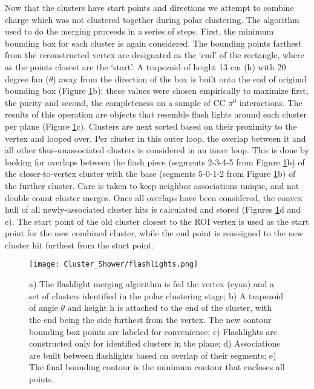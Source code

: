 \par Now that the clusters have start points and directions we attempt to combine charge which was not clustered together during polar clustering. The algorithm used to do the merging proceeds in a series of steps.  First, the minimum bounding box for each cluster is again considered. The bounding points farthest from the reconstructed vertex are designated as the `end' of the rectangle, where as the points closest are the `start'.  A trapezoid of height 13 cm (h) with 20 degree fan ($\theta$) away from the direction of the box is built onto the end of original bounding box (Figure \ref{fig:misc_flashlights}b); these values were chosen empirically to maximize first, the purity and second, the completeness on a sample of CC $\pi^0$ interactions.  The results of this operation are objects that resemble flash lights around each cluster per plane (Figure \ref{fig:misc_flashlights}c). Clusters are next sorted based on their proximity to the vertex and looped over. Per cluster in this outer loop, the overlap between it and all other thus-unassociated clusters is considered in an inner loop.  This is done by looking for overlaps between the flash piece (segments 2-3-4-5 from Figure \ref{fig:misc_flashlights}b) of the closer-to-vertex cluster with the base (segments 5-0-1-2 from Figure \ref{fig:misc_flashlights}b) of the further cluster. Care is taken to keep neighbor associations unique, and not double count cluster merges. Once all overlaps have been considered, the convex hull \cite{bib:convexHull} of all newly-associated cluster hits is calculated and stored (Figures \ref{fig:misc_flashlights}d and e). The start point of the old cluster closest to the ROI vertex is used as the start point for the new combined cluster, while the end point is reassigned to the new cluster hit furthest from the start point.

\begin{figure}[h!]
\centering
\texttt{[image: Cluster\_Shower/flashlights.png]}
\caption{ a) The flashlight merging algorithm is fed the vertex (cyan) and a set of clusters identified in the polar clustering stage; b) A trapezoid of angle $\theta$ and height h is attached to the end of the cluster, with the end being the side furthest from the vertex.  The new contour bounding box points are labeled for convenience; c) Flashlights are constructed only for identified clusters in the plane; d) Associations are built between flashlights based on overlap of their segments; e) The final bounding contour is the minimum contour that encloses all points.  }
\label{fig:misc_flashlights}
\end{figure}

